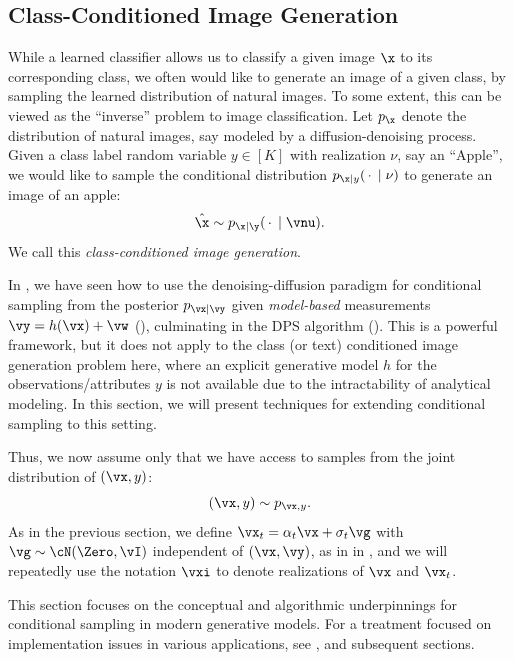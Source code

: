 \documentclass[../../book-main.tex]{subfiles}
\begin{document}
\subsection{Class-Conditioned Image Generation}\label{sub:cfg}
While a learned classifier allows us to classify a given image $\x$ to its
corresponding class, we often would like to generate an image of a
given class, by
sampling the learned distribution of natural images. To some extent, this can be
viewed as the ``inverse'' problem to image classification. Let $p_{\x}$ denote
the distribution of natural images, say modeled by a diffusion-denoising
process. Given a class label random variable $y \in [K]$ with
realization $\nu$, say
an ``Apple'', we would like to sample the conditional distribution $p_{\x \mid
y}(\,\cdot\, \mid \nu)$ to generate an image of an apple:
\begin{equation}
    \hat{\x} \sim p_{\x\mid \y}(\,\cdot\, \mid \vnu).
\end{equation}
We call this {\em class-conditioned image generation}.

In , we have seen how to use the
denoising-diffusion paradigm for
conditional sampling from the posterior $p_{\vx \mid \vy}$ given
\textit{model-based} measurements $\vy = h(\vx) + \vw$
(), culminating in the
DPS algorithm (). This
is a powerful
framework, but it does not apply to the class (or text) conditioned image
generation problem here, where an explicit generative model $h$ for the
observations/attributes $y$ is not available due to the
intractability of analytical modeling. In this section, we will
present techniques for extending
conditional sampling to this setting.

Thus, we now assume only that we have access to samples from the joint
distribution of $(\vx, y)$:
\begin{equation}
    (\vx, y) \sim p_{\vx, y}.
\end{equation}
As in the previous section, we define $\vx_t = \alpha_t \vx + \sigma_t \vg$
with $\vg \sim \cN(\Zero, \vI)$ independent of $(\vx, \vy)$, as in
 in ,
and we will repeatedly use the notation $\vxi$ to denote realizations of $\vx$
and $\vx_t$.

This section focuses on the conceptual and algorithmic underpinnings for
conditional sampling in modern generative models. For a treatment focused on
implementation issues in various applications, see ,
 and subsequent sections.
\end{document}
